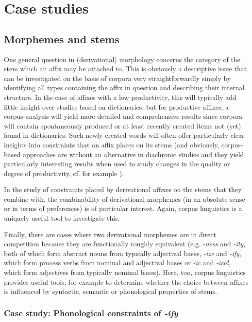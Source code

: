\section{Case studies}
\label{sec:moprphologycasestudies}

\subsection{Morphemes and stems}
\label{sec:morphemesandstems}

One general question in (derivational) morphology concerns the category of the stem which an affix may be attached to. This is obviously a descriptive issue that can be investigated on the basis of corpora very straightforwardly simply by identifying all types containing the affix in question and describing their internal structure. In the case of affixes with a low productivity, this will typically add little insight over studies based on dictionaries, but for productive affixes, a corpus-analysis will yield more detailed and comprehensive results since corpora will contain spontaneously produced or at least recently created items not (yet) found in dictionaries. Such newly-created words will often offer particularly clear insights into constraints that an affix places on its stems (and obviously, corpus-based approaches are without an alternative in diachronic studies and they yield particularly interesting results when used to study changes in the quality or degree of productivity, cf. for example \citet{dalton-puffer_french_1996}).

In the study of constraints placed by derivational affixes on the stems that they combine with, the combinability of derivational morphemes (in an absolute sense or in terms of preferences) is of particular interest. Again, corpus linguistics is a uniquely useful tool to investigate this.

Finally, there are cases where two derivational morphemes are in direct competition because they are functionally roughly equivalent (e.g. \textit{-ness} and \textit{-ity}, both of which form abstract nouns from typically adjectival bases, \textit{-ize} and \textit{-ify}, which form process verbs from nominal and adjectival bases or \textit{-ic} and \textit{-ical}, which form adjectives from typically nominal bases). Here, too, corpus linguistics provides useful tools, for example to determine whether the choice between affixes is influenced by syntactic, semantic or phonological properties of stems.

\subsubsection{Case study: Phonological constraints of \textit{-ify}}
\label{sec:phonologicalconstraintsofify}

